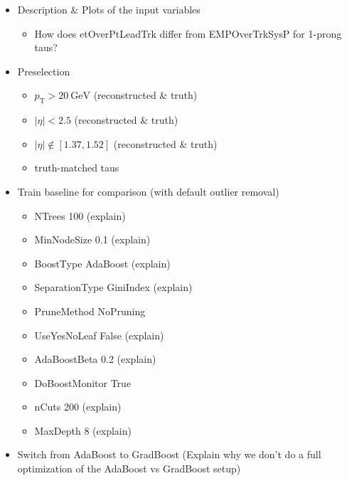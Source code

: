 \begin{itemize}
\item Description \& Plots of the input variables
  \begin{itemize}
  \item How does etOverPtLeadTrk differ from EMPOverTrkSysP for 1-prong taus?
  \end{itemize}

\item Preselection
  \begin{itemize}
  \item $p_\mathrm{T} > \SI{20}{\GeV}$ (reconstructed \& truth)
  \item $| \eta | < 2.5$ (reconstructed \& truth)
  \item $| \eta | \notin \left[ 1.37, 1.52 \right]$ (reconstructed \& truth)
  \item truth-matched taus
  \end{itemize}

\item Train baseline for comparison (with default outlier removal)
  \begin{itemize}
  \item NTrees 100 (explain)
  \item MinNodeSize 0.1 (explain)
  \item BoostType AdaBoost (explain)
  \item SeparationType GiniIndex (explain)
  \item PruneMethod NoPruning
  \item UseYesNoLeaf False (explain)
  \item AdaBoostBeta 0.2 (explain)
  \item DoBoostMonitor True
  \item nCuts 200 (explain)
  \item MaxDepth 8 (explain)
  \end{itemize}

\item Switch from AdaBoost to GradBoost (Explain why we don't do a full
  optimization of the AdaBoost vs GradBoost setup)


\end{itemize}

